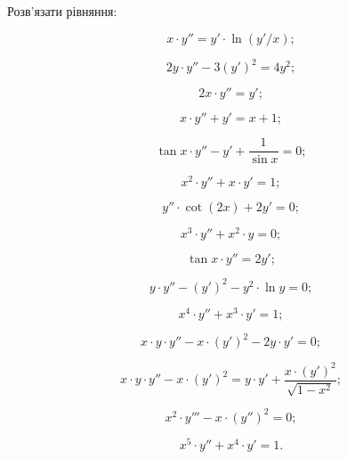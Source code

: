 Розв’язати рівняння:
\begin{multicols}{2}
\begin{problem}
	\[x \cdot y'' = y' \cdot \ln (y'/x);\]
\end{problem}
\begin{problem}
	\[ 2 y \cdot y'' - 3 (y')^2 = 4 y^2;\]
\end{problem}
\begin{problem}
	\[2x \cdot y'' = y';\]
\end{problem}
\begin{problem}
	\[x \cdot y'' + y' = x + 1;\]
\end{problem}
\begin{problem}
	\[\tan x \cdot y'' - y' + \frac{1}{\sin x}=0;\]
\end{problem}
\begin{problem}
	\[x^2\cdot y''+x\cdot y'=1;\]
\end{problem}
\begin{problem}
	\[y'' \cdot \cot (2x) + 2y' = 0;\]
\end{problem}
\begin{problem}
	\[x^3 \cdot y'' + x^2 \cdot y = 0;\]
\end{problem}
\begin{problem}
	\[\tan x \cdot y'' = 2 y';\]
\end{problem}
\begin{problem}
	\[y \cdot y'' - (y')^2 - y^2 \cdot \ln y = 0;\]
\end{problem}
\begin{problem}
	\[x^4\cdot y''+x^3\cdot y'=1;\]
\end{problem}
\begin{problem}
	\[x\cdot y\cdot y''-x \cdot (y')^2 - 2 y \cdot y' = 0;\]
\end{problem}
\begin{problem}
	\[x\cdot y\cdot y''-x \cdot (y')^2 = y \cdot y'+\frac{x \cdot (y')^2}{\sqrt{1-x^2}};\]
\end{problem}
\begin{problem}
	\[x^2\cdot y'''-x \cdot (y'')^2=0;\]
\end{problem}
\begin{problem}
	\[x^5\cdot y''+x^4 \cdot y'=1.\]
\end{problem}
\end{multicols}